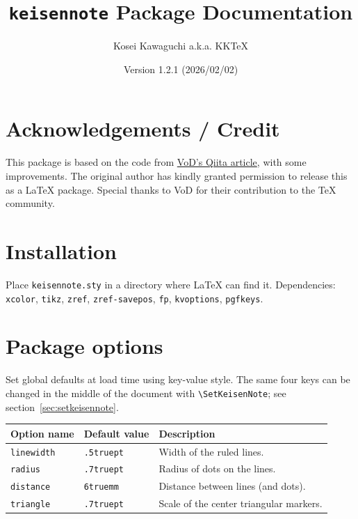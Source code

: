 \documentclass[luatex,fontsize=8pt,paper=b5,twoside]{jlreq}%
\title{\texttt{keisennote} Package Documentation}
\author{Kosei Kawaguchi a.k.a. KKTeX}
\date{Version 1.2.1 (2026/02/02)}
\begin{document}
\begin{titlepage}
  \maketitle
\end{titlepage}
\newpage
\tableofcontents
\newpage

\section{Acknowledgements / Credit}
This package is based on the code from \href{https://qiita.com/VoD/items/6849e63b978050218d2f}{VoD's Qiita article}, 
with some improvements. The original author has kindly granted permission 
to release this as a LaTeX package. Special thanks to VoD for their contribution to the TeX community.

\section{Installation}
Place \texttt{keisennote.sty} in a directory where LaTeX can find it.
Dependencies: \texttt{xcolor}, \texttt{tikz}, \texttt{zref}, \texttt{zref-savepos}, \texttt{fp}, \texttt{kvoptions}, \texttt{pgfkeys}.

\section{Package options}
Set global defaults at load time using key-value style.
The same four keys can be changed in the middle of the document with
\texttt{\textbackslash SetKeisenNote}; see section~\ref{sec:setkeisennote}.

\bigskip
\begin{center}
  \begin{tabular}{l l p{.5\linewidth}}
    \toprule
    Option name & Default value & Description \\
    \midrule
    \texttt{linewidth} & \texttt{.5truept} & Width of the ruled lines. \\
    \texttt{radius}    & \texttt{.7truept} & Radius of dots on the lines. \\
    \texttt{distance}  & \texttt{6truemm} & Distance between lines (and dots). \\
    \texttt{triangle}  & \texttt{.7truept} & Scale of the center triangular markers. \\
    \bottomrule
  \end{tabular}
\end{center}
\bigskip
\end{document}
